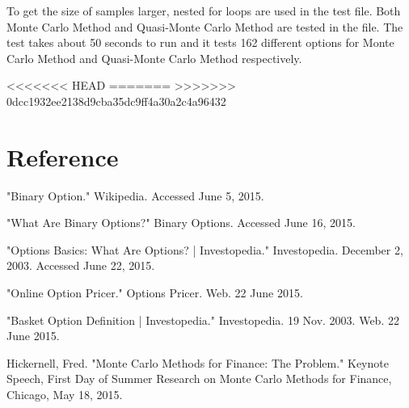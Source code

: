 \documentclass[]{elsarticle}
\theoremstyle{definition}
\theoremstyle{remark}
\begin{document}
To get the size of samples larger, nested for loops are used in the test file. Both Monte Carlo Method and Quasi-Monte Carlo Method are tested in the file. The test takes about 50 seconds to run and it tests 162 different options for Monte Carlo Method and Quasi-Monte Carlo Method respectively.

<<<<<<< HEAD
=======
\break
>>>>>>> 0dcc1932ee2138d9cba35dc9ff4a30a2c4a96432
\section*{Reference}
"Binary Option." Wikipedia. Accessed June 5, 2015.

"What Are Binary Options?" Binary Options. Accessed June 16, 2015.

"Options Basics: What Are Options? | Investopedia." Investopedia. December 2, 2003. Accessed June 22, 2015.

"Online Option Pricer." Options Pricer. Web. 22 June 2015.

"Basket Option Definition | Investopedia." Investopedia. 19 Nov. 2003. Web. 22 June 2015.

Hickernell, Fred. "Monte Carlo Methods for Finance: The Problem." Keynote Speech, First Day of Summer Research on Monte Carlo Methods for Finance, Chicago, May 18, 2015.
\end{document}
